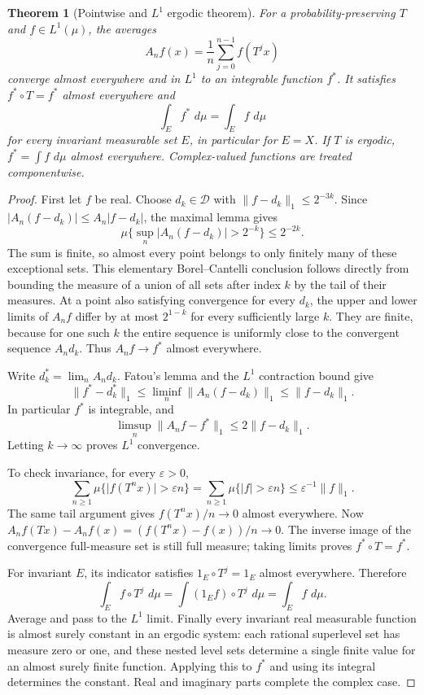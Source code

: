 \documentclass[11pt,oneside]{book}
\newtheorem{theorem}{Theorem}[chapter]
\theoremstyle{definition}
\theoremstyle{remark}\newtheorem{remark}[theorem]{Remark}
\newcommand{\dd}{\,d}\newcommand{\id}{\operatorname{id}}
\newcommand{\abs}[1]{\lvert#1\rvert}\newcommand{\norm}[1]{\lVert#1\rVert}
\begin{document}
\begin{theorem}[Pointwise and \(L^1\) ergodic theorem]\label{d13:19:birkhoff}
For a probability-preserving \(T\) and \(f\in L^1(\mu)\), the averages
\[
 A_nf(x)=\frac1n\sum_{j=0}^{n-1}f(T^jx)
\]
converge almost everywhere and in \(L^1\) to an integrable function
\(f^*\). It satisfies \(f^*\circ T=f^*\) almost everywhere and
\[
 \int_E f^*\,\dd\mu=\int_E f\,\dd\mu
\]
for every invariant measurable set \(E\), in particular for \(E=X\).
If \(T\) is ergodic, \(f^*=\int f\,\dd\mu\) almost everywhere.
Complex-valued functions are treated componentwise.
\end{theorem}
\begin{proof}
First let \(f\) be real. Choose \(d_k\in\mathcal D\) with
\(\norm{f-d_k}_1\leq2^{-3k}\). Since
\(\abs{A_n(f-d_k)}\leq A_n\abs{f-d_k}\), the maximal lemma gives
\[
 \mu\{\sup_n\abs{A_n(f-d_k)}>2^{-k}\}\leq2^{-2k}.
\]
The sum is finite, so almost every point belongs to only finitely
many of these exceptional sets. This elementary Borel--Cantelli
conclusion follows directly from bounding the measure of a union
of all sets after index \(k\) by the tail of their measures.
At a point also satisfying convergence for every \(d_k\),
the upper and lower limits of \(A_nf\) differ by at most \(2^{1-k}\)
for every sufficiently large \(k\). They are finite, because for
one such \(k\) the entire sequence is uniformly close to the
convergent sequence \(A_nd_k\). Thus \(A_nf\to f^*\) almost everywhere.

Write \(d_k^*=\lim_nA_nd_k\). Fatou's lemma and the \(L^1\)
contraction bound give
\[
 \norm{f^*-d_k^*}_1
 \leq\liminf_n\norm{A_n(f-d_k)}_1\leq\norm{f-d_k}_1.
\]
In particular \(f^*\) is integrable, and
\[
 \limsup_n\norm{A_nf-f^*}_1\leq2\norm{f-d_k}_1.
\]
Letting \(k\to\infty\) proves \(L^1\) convergence.

To check invariance, for every \(\varepsilon>0\),
\[
 \sum_{n\geq1}\mu\{\abs{f(T^nx)}>\varepsilon n\}
 =\sum_{n\geq1}\mu\{\abs{f}>\varepsilon n\}
 \leq\varepsilon^{-1}\norm{f}_1.
\]
The same tail argument gives \(f(T^nx)/n\to0\) almost everywhere.
Now
\(A_nf(Tx)-A_nf(x)=(f(T^nx)-f(x))/n\to0\).
The inverse image of the convergence full-measure set is still
full measure; taking limits proves \(f^*\circ T=f^*\).

For invariant \(E\), its indicator satisfies
\(1_E\circ T^j=1_E\) almost everywhere. Therefore
\[
 \int_E f\circ T^j\,\dd\mu
 =\int (1_Ef)\circ T^j\,\dd\mu=\int_Ef\,\dd\mu.
\]
Average and pass to the \(L^1\) limit.
Finally every invariant real measurable function is almost surely
constant in an ergodic system: each rational superlevel set has
measure zero or one, and these nested level sets determine a single
finite value for an almost surely finite function.
Applying this to \(f^*\) and using its integral determines the
constant. Real and imaginary parts complete the complex case.
\end{proof}
\end{document}
